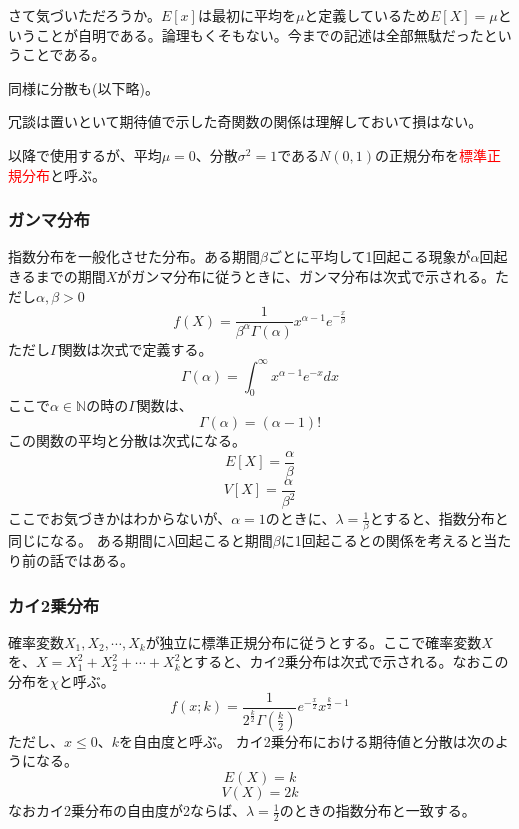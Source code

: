 \documentclass[a4paper,10pt]{jarticle}
\begin{document}
さて気づいただろうか。$E[x]$は最初に平均を$\mu$と定義しているため$E[X]=\mu$ということが自明である。論理もくそもない。今までの記述は全部無駄だったということである。

同様に分散も(以下略)。

冗談は置いといて期待値で示した奇関数の関係は理解しておいて損はない。

以降で使用するが、平均$\mu=0$、分散$\sigma^2=1$である$N(0,1)$の正規分布を\textcolor{red}{標準正規分布}と呼ぶ。
\subsubsection{ガンマ分布}
指数分布を一般化させた分布。ある期間$\beta$ごとに平均して1回起こる現象が$\alpha$回起きるまでの期間$X$がガンマ分布に従うときに、ガンマ分布は次式で示される。ただし$\alpha,\beta>0$
\begin{equation}
    f(X) = \frac{1}{\beta^\alpha\Gamma(\alpha)}x^{\alpha-1}e^{-\frac{x}{\beta}}\tag{3,21}
\end{equation}
ただし$\Gamma$関数は次式で定義する。
\begin{equation}
    \Gamma(\alpha) = \int^\infty_0x^{\alpha-1}e^{-x}dx\tag{3,22}
\end{equation}
ここで$\alpha\in\mathbb{N}$の時の$\Gamma$関数は、
\begin{equation}
    \Gamma(\alpha) = (\alpha-1)!\tag{3,23}
\end{equation}
この関数の平均と分散は次式になる。
\begin{equation}
    E[X] = \frac{\alpha}{\beta}\tag{3,24}
\end{equation}
\begin{equation}
    V[X] = \frac{\alpha}{\beta^2}\tag{3,25}
\end{equation}
ここでお気づきかはわからないが、$\alpha=1$のときに、$\lambda= \frac{1}{\beta}$とすると、指数分布と同じになる。
ある期間に$\lambda$回起こると期間$\beta$に1回起こるとの関係を考えると当たり前の話ではある。
\subsubsection{カイ2乗分布}
確率変数$X_1,X_2,\cdots,X_k$が独立に標準正規分布に従うとする。ここで確率変数$X$を、$X=X_1^2+X_2^2+\cdots+X_k^2$とすると、カイ2乗分布は次式で示される。なおこの分布を$\chi$と呼ぶ。
\begin{equation}
    f(x;k)= \frac{1}{2^{\frac{k}{2}}\Gamma(\frac{k}{2})}e^{-\frac{x}{2}}x^{\frac{k}{2}-1}\tag{3,26}
\end{equation}
ただし、$x\leq 0$、$k$を自由度と呼ぶ。
カイ2乗分布における期待値と分散は次のようになる。
\begin{equation}
    E(X) = k\tag{3,27}
\end{equation}
\begin{equation}
    V(X) = 2k\tag{3,28}
\end{equation}
なおカイ2乗分布の自由度が2ならば、$\lambda = \frac{1}{2}$のときの指数分布と一致する。
\end{document}

